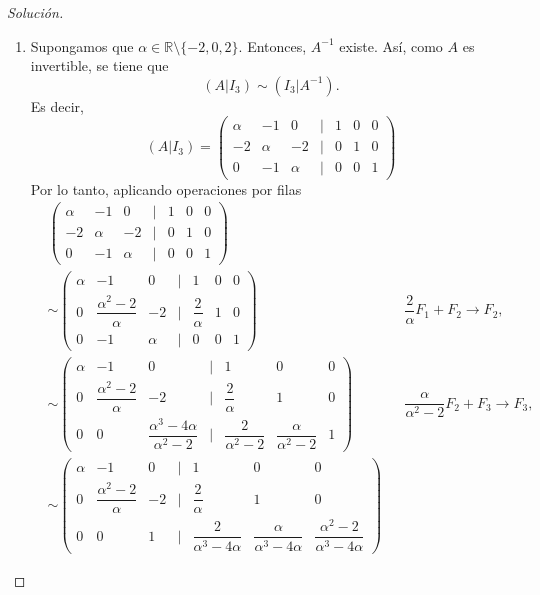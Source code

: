 \documentclass[a4,11pt]{aleph-notas}
\begin{document}
\begin{proof}[Solución]
\begin{enumerate}
    \item Supongamos que $\alpha \in \mathbb{R}\setminus\{-2, 0, 2\}$. Entonces, $A^{-1}$ existe. Así, como $A$ es invertible, se tiene que 
    \[
        (A|I_3)\sim (I_3|A^{-1}).
    \]
    Es decir, 
    \[
        (A|I_3) =  \begin{pmatrix}
                \alpha & -1 & 0 & | & 1 & 0 & 0 \\
                -2 & \alpha & -2 & | & 0 & 1 & 0\\
                0 & -1 & \alpha & | & 0 & 0 & 1
            \end{pmatrix}
    \]
    Por lo tanto, aplicando operaciones por filas
    \begin{align*}
         &\begin{pmatrix}
                \alpha & -1 & 0 & | & 1 & 0 & 0 \\
                -2 & \alpha & -2 & | & 0 & 1 & 0\\
                0 & -1 & \alpha & | & 0 & 0 & 1
            \end{pmatrix} 
            \\
            &\sim  \begin{pmatrix}
                \alpha & -1 & 0 & | & 1 & 0 & 0 \\
                0 & \dfrac{\alpha^2-2}{\alpha} & -2 & | & \dfrac{2}{\alpha} & 1 & 0\\
                0 & -1 & \alpha & | & 0 & 0 & 1
            \end{pmatrix} && \dfrac{2}{\alpha} F_1 + F_2 \rightarrow F_2, \\
            & \sim \begin{pmatrix}
                \alpha & -1 & 0 & | & 1 & 0 & 0 \\
                0 & \dfrac{\alpha^2-2}{\alpha} & -2 & | & \dfrac{2}{\alpha} & 1 & 0\\
                0 & 0 & \dfrac{\alpha^3-4\alpha}{\alpha^2-2} & | & \dfrac{2}{\alpha^2-2} & \dfrac{\alpha}{\alpha^2-2} & 1
            \end{pmatrix} && \dfrac{\alpha}{\alpha^2-2} F_2 + F_3 \rightarrow F_3, \\
            & \sim \begin{pmatrix}
                \alpha & -1 & 0 & | & 1 & 0 & 0 \\
                0 & \dfrac{\alpha^2-2}{\alpha} & -2 & | & \dfrac{2}{\alpha} & 1 & 0\\
                0 & 0 & 1 & | & \dfrac{2}{\alpha^3-4\alpha} & \dfrac{\alpha}{\alpha^3-4\alpha} & \dfrac{\alpha^2-2}{\alpha^3-4\alpha}

\end{pmatrix}
\end{align*}
\end{enumerate}
\end{proof}
\end{document}
